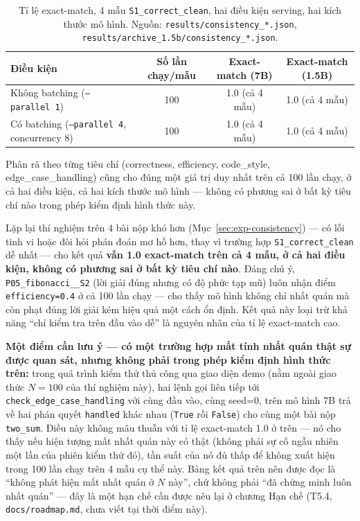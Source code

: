 \documentclass[a4paper,12pt]{report}
\begin{document}
\begin{table}[h]
\centering
\begin{tabular}{lccc}
\toprule
\textbf{Điều kiện} & \textbf{Số lần chạy/mẫu} & \textbf{Exact-match (7B)} & \textbf{Exact-match (1.5B)} \\
\midrule
Không batching (\texttt{--parallel 1}) & 100 & 1.0 (cả 4 mẫu) & 1.0 (cả 4 mẫu) \\
Có batching (\texttt{--parallel 4}, concurrency 8) & 100 & 1.0 (cả 4 mẫu) & 1.0 (cả 4 mẫu) \\
\bottomrule
\end{tabular}
\caption{Tỉ lệ exact-match, 4 mẫu \texttt{S1\_correct\_clean}, hai điều
kiện serving, hai kích thước mô hình. Nguồn: \texttt{results/consistency\_*.json},
\texttt{results/archive\_1.5b/consistency\_*.json}.}
\end{table}

Phân rã theo từng tiêu chí (correctness, efficiency, code\_style,
edge\_case\_handling) cũng cho đúng một giá trị duy nhất trên cả 100 lần
chạy, ở cả hai điều kiện, cả hai kích thước mô hình — không có phương sai ở
bất kỳ tiêu chí nào trong phép kiểm định hình thức này.

Lặp lại thí nghiệm trên 4 bài nộp khó hơn (Mục~\ref{sec:exp-consistency}) —
có lỗi tinh vi hoặc đòi hỏi phán đoán mơ hồ hơn, thay vì trường hợp
\texttt{S1\_correct\_clean} dễ nhất — cho kết quả \textbf{vẫn 1.0
exact-match trên cả 4 mẫu, ở cả hai điều kiện, không có phương sai ở bất kỳ
tiêu chí nào}. Đáng chú ý, \texttt{P05\_fibonacci\_\_S2} (lời giải đúng
nhưng có độ phức tạp mũ) luôn nhận điểm \texttt{efficiency=0.4} ở cả 100
lần chạy — cho thấy mô hình không chỉ nhất quán mà còn phạt đúng lời giải
kém hiệu quả một cách ổn định. Kết quả này loại trừ khả năng ``chỉ kiểm tra
trên đầu vào dễ'' là nguyên nhân của tỉ lệ exact-match cao.

\textbf{Một điểm cần lưu ý — có một trường hợp mất tính nhất quán thật sự
được quan sát, nhưng không phải trong phép kiểm định hình thức trên:}
trong quá trình kiểm thử thủ công qua giao diện demo (nằm ngoài giao thức
$N=100$ của thí nghiệm này), hai lệnh gọi liên tiếp tới
\texttt{check\_edge\_case\_handling} với cùng đầu vào, cùng seed=0, trên mô
hình 7B trả về hai phán quyết \texttt{handled} khác nhau (\texttt{True} rồi
\texttt{False}) cho cùng một bài nộp \texttt{two\_sum}. Điều này không mâu
thuẫn với tỉ lệ exact-match 1.0 ở trên — nó cho thấy nếu hiện tượng mất
nhất quán này có thật (không phải sự cố ngẫu nhiên một lần của phiên kiểm
thử đó), tần suất của nó đủ thấp để không xuất hiện trong 100 lần chạy trên
4 mẫu cụ thể này. Bảng kết quả trên nên được đọc là ``không phát hiện mất
nhất quán ở $N$ này'', chứ không phải ``đã chứng minh luôn nhất quán'' —
đây là một hạn chế cần được nêu lại ở chương Hạn chế (T5.4,
\texttt{docs/roadmap.md}, chưa viết tại thời điểm này).
\end{document}
